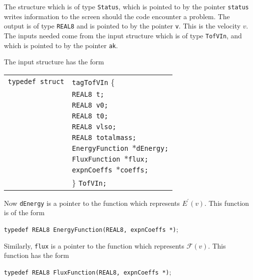 \documentclass[12pt]{article}
\begin{document}
\vspace{5mm}

The structure which is of type \texttt{Status}, which is pointed to by the pointer \texttt{status} writes information to the screen should the code encounter a problem. The output is of type \texttt{REAL8} and is pointed to by the pointer \texttt{v}. This is the velocity $v$.
The inputs needed come from the input structure which is of type \texttt{TofVIn}, and which is pointed to by the pointer \texttt{ak}.

The input structure has the form

\vspace{5mm}

\begin{tabular}{ll}
\texttt{typedef struct} & \texttt{tagTofVIn} \{ \\
                        & \texttt{REAL8 t;} \\
                        & \texttt{REAL8 v0;} \\
                        & \texttt{REAL8 t0;} \\
                        & \texttt{REAL8 vlso;} \\
                        & \texttt{REAL8 totalmass;} \\
                        & \texttt{EnergyFunction $\ast$dEnergy;}  \\
                        & \texttt{FluxFunction $\ast$flux;}  \\
                        & \texttt{expnCoeffs $\ast$coeffs;}  \\
                        & \} \texttt{TofVIn;}
\end{tabular}

\vspace{5mm}


Now \texttt{dEnergy} is a pointer to the function which represents $E^{\prime}(v)$. This function is of the form

\vspace{5mm}

\texttt{typedef REAL8 EnergyFunction(REAL8, expnCoeffs *)};

\vspace{5mm}

Similarly, \texttt{flux} is a pointer to the function which represents $\mathcal{F}(v)$. This function has the form

\vspace{5mm}

\texttt{typedef REAL8 FluxFunction(REAL8, expnCoeffs *)};
\end{document}
